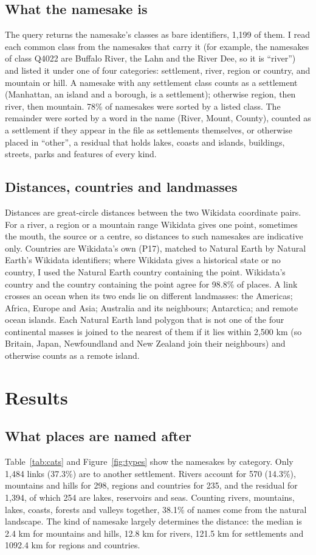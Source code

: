 \documentclass[11pt,a4paper]{article}
\begin{document}
\subsection{What the namesake is}
The query returns the namesake's classes as bare identifiers, 1,199 of them. I read each common class from the namesakes that carry it (for example, the namesakes of class Q4022 are Buffalo River, the Lahn and the River Dee, so it is ``river'') and listed it under one of four categories: settlement, river, region or country, and mountain or hill. A namesake with any settlement class counts as a settlement (Manhattan, an island and a borough, is a settlement); otherwise region, then river, then mountain. 78\% of namesakes were sorted by a listed class. The remainder were sorted by a word in the name (River, Mount, County), counted as a settlement if they appear in the file as settlements themselves, or otherwise placed in ``other'', a residual that holds lakes, coasts and islands, buildings, streets, parks and features of every kind.

\subsection{Distances, countries and landmasses}
Distances are great-circle distances between the two Wikidata coordinate pairs. For a river, a region or a mountain range Wikidata gives one point, sometimes the mouth, the source or a centre, so distances to such namesakes are indicative only. Countries are Wikidata's own (P17), matched to Natural Earth \citep{naturalearth} by Natural Earth's Wikidata identifiers; where Wikidata gives a historical state or no country, I used the Natural Earth country containing the point. Wikidata's country and the country containing the point agree for 98.8\% of places. A link crosses an ocean when its two ends lie on different landmasses: the Americas; Africa, Europe and Asia; Australia and its neighbours; Antarctica; and remote ocean islands. Each Natural Earth land polygon that is not one of the four continental masses is joined to the nearest of them if it lies within 2,500 km (so Britain, Japan, Newfoundland and New Zealand join their neighbours) and otherwise counts as a remote island.

\section{Results}
\subsection{What places are named after}
Table~\ref{tab:cats} and Figure~\ref{fig:types} show the namesakes by category. Only 1,484 links (37.3\%) are to another settlement. Rivers account for 570 (14.3\%), mountains and hills for 298, regions and countries for 235, and the residual for 1,394, of which 254 are lakes, reservoirs and seas. Counting rivers, mountains, lakes, coasts, forests and valleys together, 38.1\% of names come from the natural landscape. The kind of namesake largely determines the distance: the median is 2.4 km for mountains and hills, 12.8 km for rivers, 121.5 km for settlements and 1092.4 km for regions and countries.
\end{document}
